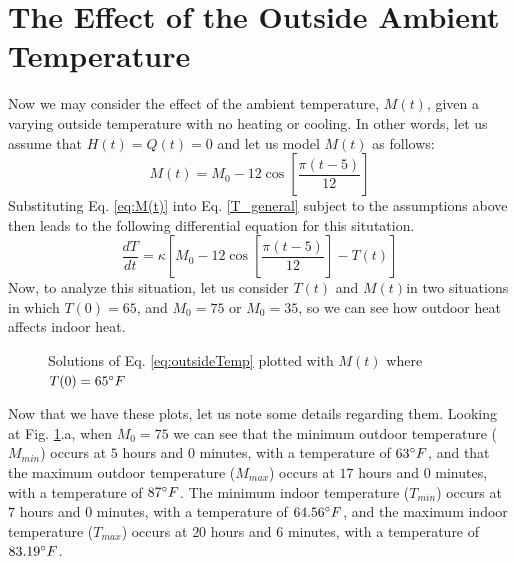 \documentclass[titlepage]{article}
\begin{document}
\section{The Effect of the Outside Ambient Temperature}
Now we may consider the effect of the ambient temperature, $M(t)$, given a varying outside temperature
with no heating or cooling. In other words, let us assume that $H(t)=Q(t)=0$ and let us model $M(t)$ as follows:
\begin{equation}\label{eq:M(t)}
    M(t) = M_0 - 12\cos\left[\frac{\pi(t-5)}{12}\right]
\end{equation}
Substituting Eq. \ref{eq:M(t)} into Eq. \ref{T_general} subject to the assumptions above then leads to the following differential equation for this situtation.
\begin{equation} \label{eq:outsideTemp}
    \frac{dT}{dt} = \kappa[M_0 - 12\cos\left[\frac{\pi(t-5)}{12}\right]-T(t)] 
\end{equation}
Now, to analyze this situation, let us consider $T(t)$ and $M(t)$in two situations in which $T(0)=65$, and  $M_0=75 \text{ or } M_0 = 35$, so we can see how outdoor heat affects indoor heat.
\begin{figure}[H]
    \centering
    \qquad
    \caption{Solutions of Eq. \ref{eq:outsideTemp} plotted with $M(t)$ where $T(0)=65\degree F$}%
    \label{fig:outsideTemp}%
\end{figure}
Now that we have these plots, let us note some details regarding them. Looking at Fig. \ref{fig:outsideTemp}.a, 
when $M_0=75$ we can see that the minimum outdoor temperature ($M_{min}$)  occurs at $5$ hours 
and $0$ minutes, with a temperature of $63\degree F$, and that the maximum outdoor temperature ($M_{max}$) occurs at $17$ hours and $0$ minutes, with a temperature of $87\degree F$.
The minimum indoor temperature ($T_{min}$) occurs at $7$ hours and $0$ minutes, with a temperature of $64.56\degree F$, and
the maximum indoor temperature ($T_{max}$) occurs at $20$ hours and $6$ minutes, with a temperature of $83.19\degree F$.
\end{document}
